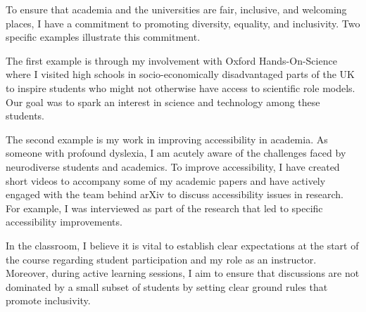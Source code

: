 \documentclass[12pt,letter]{article}
\newcounter{customtitle}
\begin{document}
To ensure that academia and the universities are fair, inclusive, and welcoming places, I have a commitment to promoting diversity, equality, and inclusivity. Two specific examples illustrate this commitment.

The first example is through my involvement with Oxford Hands-On-Science where I visited high schools in socio-economically disadvantaged parts of the UK to inspire students who might not otherwise have access to scientific role models. Our goal was to spark an interest in science and technology among these students.

The second example is my work in improving accessibility in academia. 
 As someone with profound dyslexia, I am acutely aware of the challenges faced by neurodiverse students and academics. To improve accessibility, I have created short videos to accompany some of my academic papers and have actively engaged with the team behind arXiv to discuss accessibility issues in research. For example, I was interviewed as part of the research that led to specific accessibility improvements.

In the classroom, I believe it is vital to establish clear expectations at the start of the course regarding student participation and my role as an instructor. Moreover, during active learning sessions, I aim to ensure that discussions are not dominated by a small subset of students by setting clear ground rules that promote inclusivity.



\end{document}
